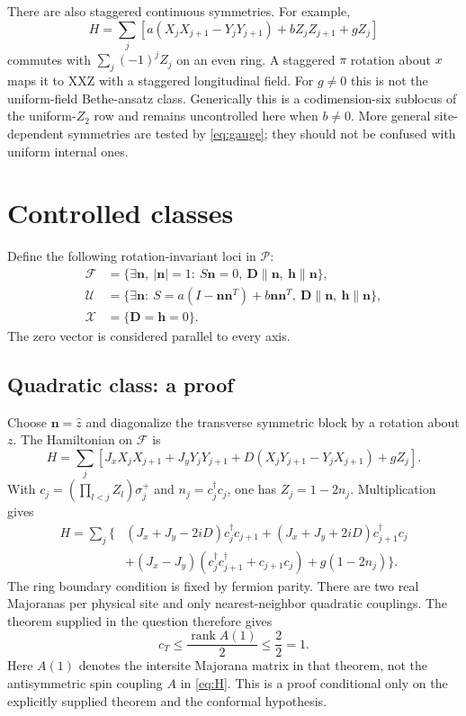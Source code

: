 \documentclass[11pt]{article}
\newcommand{\F}{\mathcal F}
\newcommand{\U}{\mathcal U}
\newcommand{\X}{\mathcal X}
\newcommand{\cP}{\mathcal P}
\newcommand{\nn}{\boldsymbol n}
\newcommand{\DD}{\boldsymbol D}
\newcommand{\hh}{\boldsymbol h}
\begin{document}
There are also staggered continuous symmetries. For example,
\begin{equation}
 H=\sum_j[a(X_jX_{j+1}-Y_jY_{j+1})+bZ_jZ_{j+1}+gZ_j]
\end{equation}
commutes with $\sum_j(-1)^jZ_j$ on an even ring. A staggered $\pi$ rotation
about $x$ maps it to XXZ with a staggered longitudinal field. For $g\ne0$ this
is not the uniform-field Bethe-ansatz class. Generically this is a
codimension-six sublocus of the uniform-$Z_2$ row and remains uncontrolled
here when $b\ne0$. More general site-dependent symmetries are tested by
\eqref{eq:gauge}; they should not be confused with uniform internal ones.

\section{Controlled classes}

Define the following rotation-invariant loci in $\cP$:
\begin{align}
 \F&=\{\exists\nn,\ |\nn|=1:\ S\nn=0,\ \DD\parallel\nn,
                  \ \hh\parallel\nn\},\label{eq:F}\\
 \U&=\{\exists\nn:\ S=a(I-\nn\nn^T)+b\nn\nn^T,
                  \ \DD\parallel\nn,\ \hh\parallel\nn\},\\
 \X&=\{\DD=\hh=0\}.
\end{align}
The zero vector is considered parallel to every axis.

\subsection{Quadratic class: a proof}

Choose $\nn=\hat z$ and diagonalize the transverse symmetric block by a
rotation about $z$. The Hamiltonian on $\F$ is
\begin{equation}
 H=\sum_j[J_xX_jX_{j+1}+J_yY_jY_{j+1}
       +D(X_jY_{j+1}-Y_jX_{j+1})+gZ_j].
\end{equation}
With $c_j=(\prod_{l<j}Z_l)\sigma_j^+$ and $n_j=c_j^\dagger c_j$, one has
$Z_j=1-2n_j$. Multiplication gives
\begin{align}
 H=\sum_j\{& (J_x+J_y-2iD)c_j^\dagger c_{j+1}
          +(J_x+J_y+2iD)c_{j+1}^\dagger c_j\\
 &+(J_x-J_y)(c_j^\dagger c_{j+1}^\dagger+c_{j+1}c_j)
       +g(1-2n_j)\}. \label{eq:JW}
\end{align}
The ring boundary condition is fixed by fermion parity. There are two real
Majoranas per physical site and only nearest-neighbor quadratic couplings.
The theorem supplied in the question therefore gives
\begin{equation}
 c_T\leq\frac{\operatorname{rank} A(1)}2\leq\frac22=1.
\end{equation}
Here $A(1)$ denotes the intersite Majorana matrix in that theorem, not the
antisymmetric spin coupling $A$ in \eqref{eq:H}. This is a proof conditional
only on the explicitly supplied theorem and the conformal hypothesis.
\end{document}
